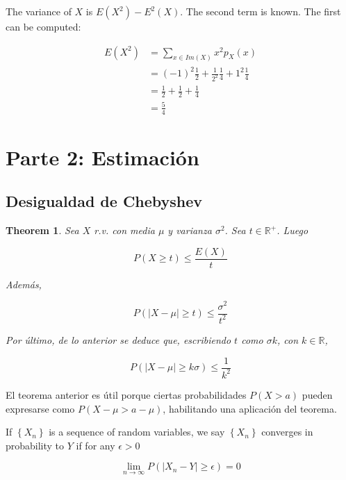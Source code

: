 \documentclass[a4paper, 12pt]{article}
\newtheorem{theorem}{Theorem}
\newtheorem{theorem}{Theorem}
\begin{document}
The variance of $X$ is $E(X^2) - E^2(X)$. The second term is known. The first can be computed:

\begin{align*}
    E(X^2) &= \sum_{x \in Im(X)} x^2 p_X(x) \\ 
           &= (-1)^2 \frac{1}{2} + \frac{1}{2^2} \frac{1}{4} + 1^2 \frac{1}{4} \\ 
           &=\frac{1}{2} + \frac{1}{2} + \frac{1}{4} \\ 
           &=\frac{5}{4}
\end{align*}



\pagebreak 

\section{Parte 2: Estimación}

\subsection{Desigualdad de Chebyshev}

\begin{theorem}
    Sea $X$ r.v. con media $\mu$ y varianza $\sigma^2$. Sea $t \in \mathbb{R}^+$. Luego 

    \begin{equation}
        P(X \geq t) \leq \frac{E(X)}{t}
    \end{equation}

    Además, 

    \begin{equation}
        P\left( |X - \mu| \geq t \right)  \leq \frac{\sigma^2}{t^2}
    \end{equation}

    Por último, de lo anterior se deduce que, escribiendo $t$ como $\sigma k$,
    con $k \in \mathbb{R}$,

    \begin{equation}
        P\left( |X-\mu| \geq k\sigma \right) \leq \frac{1}{k^2}
    \end{equation}
\end{theorem}

El teorema anterior es útil porque ciertas probabilidades $P(X > a)$ pueden expresarse 
como $P(X - \mu > a - \mu)$, habilitando una aplicación del teorema.

\begin{definition}
    If $\left\{ X_n \right\} $ is a sequence of random variables, we say $\left\{ X_n \right\} $
    converges in probability to $Y$ if for any $\epsilon > 0$ 

    \begin{equation*}
        \lim_{n \to \infty} P(|X_n - Y| \geq \epsilon) = 0
    \end{equation*}
\end{definition}
\end{document}
